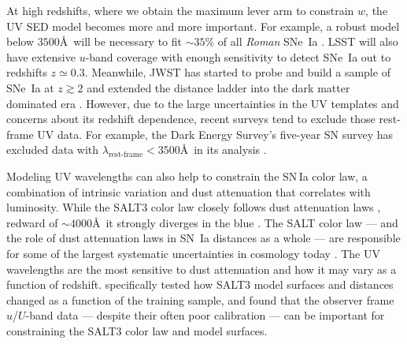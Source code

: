 \documentclass[twocolumn,tighten,times,floatfix]{aastex631}
\begin{document}
At high redshifts, where we obtain the maximum lever arm to constrain $w$, the UV SED model becomes more and more important. For example, a robust model below $3500$\AA\ will be necessary to fit $\sim35\%$ of all \textit{Roman} SNe~Ia \citep{Rose21}. LSST will also have extensive $u$-band coverage with enough sensitivity to detect SNe~Ia out to redshifts $z \simeq 0.3$. Meanwhile, JWST has started to probe and build a sample of SNe~Ia at $z\gtrsim2$ and extended the distance ladder into the dark matter dominated era \citep[e.g.][]{Pierel24, snencore, 2025ogs}. However, due to the large uncertainties in the UV templates and concerns about its redshift dependence, recent surveys tend to exclude those rest-frame UV data. For example, the Dark Energy Survey’s five-year SN survey has excluded data with $\lambda_{\textrm{rest-frame}}<3500$\AA\ in its analysis \citep{Abbott19}.

Modeling UV wavelengths can also help to constrain the SN\,Ia color law, a combination of intrinsic variation and dust attenuation that correlates with luminosity.  While the SALT3 color law closely follows dust attenuation laws \citep[e.g.,][]{Fitzpatrick99}, redward of  $\sim 4000$\AA\ it strongly diverges in the blue \citep{kenworthy_salt3_2021}.  The SALT color law --- and the role of dust attenuation laws in SN~Ia distances as a whole --- are responsible for some of the largest systematic uncertainties in cosmology today \citep{Brout21,Brout22,Popovic23}. 
The UV wavelengths are the most sensitive to dust attenuation and how it may vary as a function of redshift. \cite{Dai23} specifically tested how SALT3 model surfaces and distances changed as a function of the training sample, and found that the observer frame $u$/$U$-band data --- despite their often poor calibration --- can be important for constraining the SALT3 color law and model surfaces. 
\end{document}
